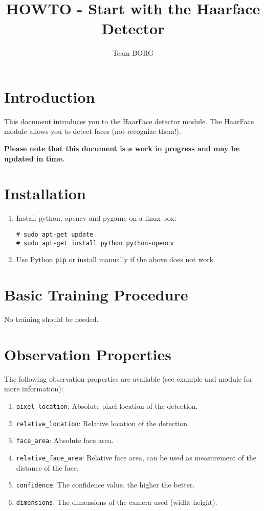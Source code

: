 \documentclass[a4paper, 10pt]{article}
\title{HOWTO - Start with the Haarface Detector}
\author{Team BORG}
\begin{document}
\maketitle

\tableofcontents

\section{Introduction}

This document introduces you to the HaarFace detector module.
The HaarFace module allows you to detect faces (not recognize them!).

\textbf{Please note that this document is a work in progress and may be updated in time.}

\section{Installation}

\begin{enumerate}
    \item Install python, opencv and pygame on a linux box:
\begin{lstlisting}
# sudo apt-get update
# sudo apt-get install python python-opencv
\end{lstlisting}
    \item Use Python \lstinline{pip} or install manually if the above does not work.
\end{enumerate}

\section{Basic Training Procedure}

No training should be needed.

\section{Observation Properties}

The following observation properties are available (see example and module for more information):
\begin{enumerate}
    \item \lstinline{pixel_location}: Absolute pixel location of the detection.
    \item \lstinline{relative_location}: Relative location of the detection.
    \item \lstinline{face_area}: Absolute face area.
    \item \lstinline{relative_face_area}: Relative face area, can be used as measurement of the distance of the face.
    \item \lstinline{confidence}: The confidence value, the higher the better.
    \item \lstinline{dimensions}: The dimensions of the camera used (widht height).
\end{enumerate}
\end{document}
